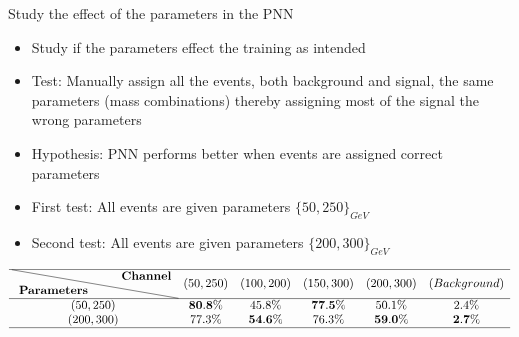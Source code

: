 \documentclass[UKenglish]{beamer}
\begin{document}
\begin{frame}{Study the effect of the parameters in the PNN}
    \begin{itemize}
        \item Study if the parameters effect the training as intended
        \item Test: Manually assign all the events, both background and 
        signal, the same parameters (mass combinations) thereby assigning
        most of the signal the wrong parameters
        \item Hypothesis: PNN performs better when events are assigned correct
        parameters 
        \item First test: All events are given parameters $\{50,250\}_{GeV}$
        \item Second test: All events are given parameters $\{200,300\}_{GeV}$
    \end{itemize}
    \begin{table}
        \tiny
        \centering
        $
        \begin{array}{cccccc}
            \hline \text { \diagbox{\textbf{Parameters}}{\textbf{Channel}} }  & \text {$(50,250)$} & \text {$(100,200)$} & \text {$(150,300)$} & \text {$(200,300)$} & \text {$(Background)$} \\
            \hline \text {$(50,250)$}   & \text { $\bf{80.8}\%$ } & \text { $45.8\%$ } & \text { $\bf{77.5}\%$ } & \text { $50.1\%$ } & \text { $2.4\%$ }  \\
            \text {$(200,300)$}   & \text { $77.3\%$ } & \text { $\bf{54.6}\%$ } & \text { $76.3\%$ } & \text { $\bf{59.0}\%$ } & \text { $\bf{2.7}\%$ }\\
            \hline
        \end{array}
        $
    \end{table}
\end{frame}
\end{document}
